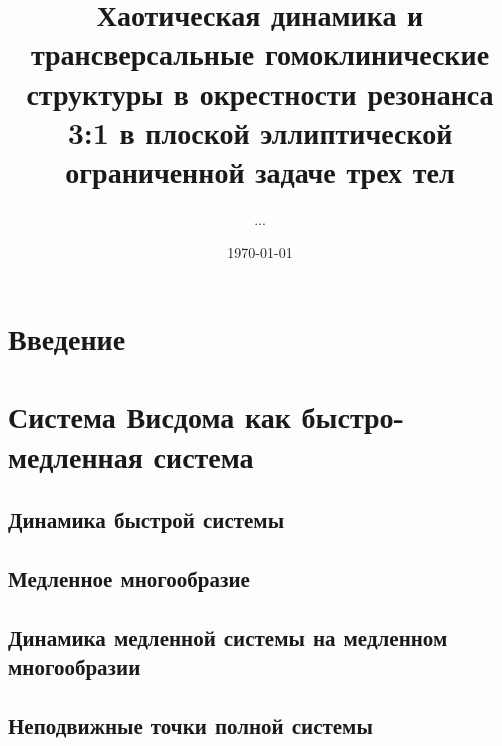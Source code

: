 \documentclass[a4paper, 12pt]{article}
\begin{document}
    \title{Хаотическая динамика и трансверсальные гомоклинические структуры в окрестности резонанса 3:1 в плоской эллиптической ограниченной задаче трех тел}
    \author{...}
    \date{\today}
    \maketitle

    
    \tableofcontents


    \section{Введение}
        

    \section{Система Висдома как быстро-медленная система}
        

        \subsection{Динамика быстрой системы}
        

        \subsection{Медленное многообразие}
        

        \subsection{Динамика медленной системы на медленном многообразии}
        

        \subsection{Неподвижные точки полной системы}
        
       
\end{document}
